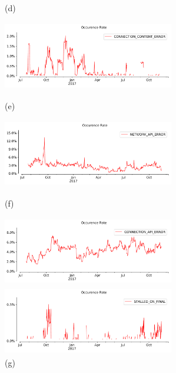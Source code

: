 \begin{figure}[!ht]
\begin{minipage}{0.5\textwidth}
		\caption[Occurrence Rate Network Content Error]{(d)}
		\label{fig:Occurrence Rate Network Content Error}
	\end{minipage}
	\begin{minipage}{0.5\textwidth}
		\centering
		\includegraphics[keepaspectratio, height=3cm, width=7.5cm]{figures/errors/netflix-occurence-rate-connection-content.pdf}
		\caption[Occurrence Rate Connection Content Error]{(e)}
		\label{fig:Occurrence Rate Connection Content Error}
	\end{minipage}
	\begin{minipage}{0.5\textwidth}
		\centering
		\includegraphics[keepaspectratio, height=3cm, width=7.5cm]{figures/errors/netflix-occurence-rate-network-api.pdf}
		\caption[Occurrence Rate Network API Error]{(f)}
		\label{fig:Occurrence Rate Network API Error}
	\end{minipage}
	\begin{minipage}{0.5\textwidth}
		\centering
		\includegraphics[keepaspectratio, height=3cm, width=7.5cm]{figures/errors/netflix-occurence-rate-connection-api.pdf}
		\caption[Occurrence Rate Connection API Error]{(g)}
		\label{fig:Occurrence Rate Connection API Error}
	\end{minipage}
	\begin{minipage}{0.5\textwidth}
		\centering
		\includegraphics[keepaspectratio, height=3cm, width=7.5cm]{figures/errors/netflix-occurence-rate-stalled-on-final.pdf}

\end{minipage}
\end{figure}
